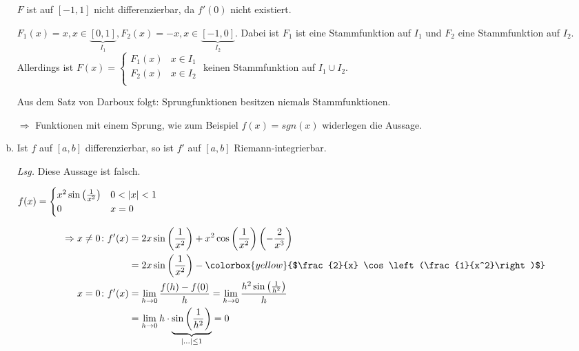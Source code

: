 \documentclass{article}
\begin{document}
\begin{enumerate}[a)]
  $F$ ist auf $[-1, 1]$ nicht differenzierbar, da $f'(0)$ nicht existiert.

  $F_1(x) = x, x \in \underset{I_1}{\underbrace{[0, 1]}},
  F_2(x) = -x, x \in \underset{I_2}{\underbrace{[-1, 0]}}$.
  Dabei ist $F_1$ ist eine Stammfunktion auf $I_1$ und $F_2$ eine Stammfunktion
  auf $I_2$.
  Allerdings ist $F(x) = \begin{cases}
    F_1(x) & x \in I_1 \\
    F_2(x) & x \in I_2 \\
  \end{cases}$ keinen Stammfunktion auf $I_1 \cup I_2$.


  Aus dem Satz von Darboux folgt: Sprungfunktionen besitzen niemals Stammfunktionen.

  $\Rightarrow$ Funktionen mit einem Sprung, wie zum Beispiel $f(x) = sgn(x)$
  widerlegen die Aussage.

  
\item Ist $f$ auf $[a, b]$ differenzierbar, so ist $f'$ auf $[a, b]$ Riemann-integrierbar.

  \textit{Lsg.} Diese Aussage ist falsch.

  $f(x) = \begin{cases}
    x^2 \sin\left(\frac{1}{x^2}\right) & 0 < \abs{x} < 1 \\
    0 & x = 0 \\
  \end{cases}$

  \begin{align*}
    \Rightarrow x \ne 0 \colon f'(x) &= 2x \sin\left(\frac{1}{x^2}\right) + x^2 \cos\left(\frac{1}{x^2}\right)\left(-\frac{2}{x^3}\right) \\
                                     &= 2x \sin\left(\frac{1}{x^2}\right) - \colorbox{yellow}{$\frac{2}{x} \cos\left(\frac{1}{x^2}\right)$} \\
    x = 0 \colon f'(x) &= \lim_{h \to 0} \frac{f(h) - f(0)}{h} = \lim_{h \to 0} \frac{h^2 \sin\left(\frac{1}{h^2}\right)}{h} \\
                                     &= \lim_{h \to 0} h \cdot \underset{\abs{\ldots} \leq 1}{\underbrace{\sin\left(\frac{1}{h^2}\right)}} = 0 \\
  \end{align*}


\end{enumerate}
\end{document}
